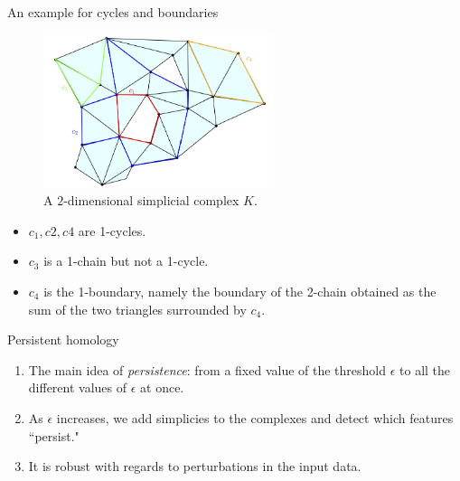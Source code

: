 \documentclass[xcolor={dvipsnames,svgnames}]{beamer}
\begin{document}
\begin{frame}{An example for cycles and boundaries}
\begin{figure}[H]
   \label{matching}
        \centering \includegraphics[width=0.6\textwidth]{figures/simplicial_complex.png}
            \caption{A $2$-dimensional simplicial complex $K$.}
    \end{figure}
\begin{itemize}
    \item $c_1, c2, c4$ are 1-cycles.
    \item $c_3$ is a 1-chain but not a 1-cycle.
    \item $c_4$ is the 1-boundary, namely the boundary
of the 2-chain obtained as the sum of the two triangles surrounded by $c_4$. 
\end{itemize}
\end{frame}

\begin{frame}{Persistent homology}
 
\begin{enumerate}
    \item The main idea of \textit{persistence}: from a fixed value of the threshold $\epsilon$ to all the different values of $\epsilon$ at once.
    \item As $\epsilon$ increases, we add simplicies to the complexes and detect which features ``persist."
    \item It is robust with regards to perturbations in the input data. 
\end{enumerate}
\end{frame}
\end{document}
